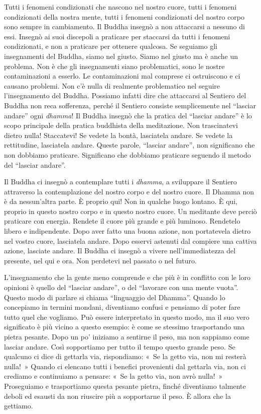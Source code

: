 Tutti i fenomeni condizionati che nascono nel nostro cuore, tutti i
fenomeni condizionati della nostra mente, tutti i fenomeni condizionati
del nostro corpo sono sempre in cambiamento. Il Buddha insegnò a non
attaccarsi a nessuno di essi. Insegnò ai suoi discepoli a praticare per
staccarsi da tutti i fenomeni condizionati, e non a praticare per
ottenere qualcosa. Se seguiamo gli insegnamenti del Buddha, siamo nel
giusto. Siamo nel giusto ma è anche un problema. Non è che gli
insegnamenti siano problematici, sono le nostre contaminazioni a
esserlo. Le contaminazioni mal comprese ci ostruiscono e ci causano
problemi. Non c'è nulla di realmente problematico nel seguire
l'insegnamento del Buddha. Possiamo infatti dire che attaccarsi al
Sentiero del Buddha non reca sofferenza, perché il Sentiero consiste
semplicemente nel ``lasciar andare'' ogni \emph{dhamma}! Il Buddha
insegnò che la pratica del ``lasciar andare'' è lo scopo principale
della pratica buddhista della meditazione. Non trascinatevi dietro
nulla! Staccatevi! Se vedete la bontà, lasciatela andare. Se vedete la
rettitudine, lasciatela andare. Queste parole, ``lasciar andare'', non
significano che non dobbiamo praticare. Significano che dobbiamo
praticare seguendo il metodo del ``lasciar andare''.

Il Buddha ci insegnò a contemplare tutti i \emph{dhamma}, a sviluppare
il Sentiero attraverso la contemplazione del nostro corpo e del nostro
cuore. Il Dhamma non è da nessun'altra parte. È proprio qui! Non in
qualche luogo lontano. È qui, proprio in questo nostro corpo e in questo
nostro cuore. Un meditante deve perciò praticare con energia. Rendete il
cuore più grande e più luminoso. Rendetelo libero e indipendente. Dopo
aver fatto una buona azione, non portatevela dietro nel vostro cuore,
lasciatela andare. Dopo esservi astenuti dal compiere una cattiva
azione, lasciate andare. Il Buddha ci insegnò a vivere nell'immediatezza
del presente, nel qui e ora. Non perdetevi nel passato o nel futuro.

L'insegnamento che la gente meno comprende e che più è in conflitto con
le loro opinioni è quello del ``lasciar andare'', o del ``lavorare con
una mente vuota''. Questo modo di parlare si chiama ``linguaggio del
Dhamma''. Quando lo concepiamo in termini mondani, diventiamo confusi e
pensiamo di poter fare tutto quel che vogliamo. Può essere interpretato
in questo modo, ma il suo vero significato è più vicino a questo
esempio: è come se stessimo trasportando una pietra pesante. Dopo un po'
iniziamo a sentirne il peso, ma non sappiamo come lasciar andare. Così
sopportiamo per tutto il tempo questo grande peso. Se qualcuno ci dice
di gettarla via, rispondiamo: «~Se la getto via, non mi resterà nulla!~»
Quando ci elencano tutti i benefici provenienti dal gettarla via, non ci
crediamo e continuiamo a pensare: «~Se la getto via, non avrò nulla!~»
Proseguiamo e trasportiamo questa pesante pietra, finché diventiamo
talmente deboli ed esausti da non riuscire più a sopportarne il peso. È
allora che la gettiamo.

